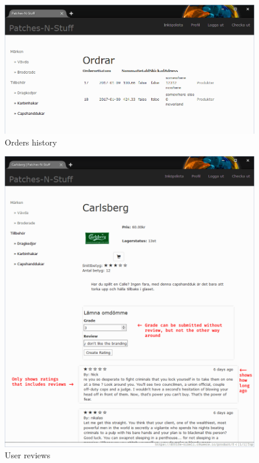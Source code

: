\documentclass[paper=a4, fontsize=11pt]{report} %
\begin{document}
\begin{itemize}
\begin{figure}
	\includegraphics[width=0.9\paperwidth]{artifacts/stories/12_orders.png}
	\caption{Orders history}
	\label{fig:orders}
\end{figure}

\begin{figure}
	\includegraphics[width=0.9\paperwidth]{artifacts/stories/13_comments.png}
	\caption{User reviews}
	\label{fig:comments}
\end{figure}


\end{itemize}
\end{document}
